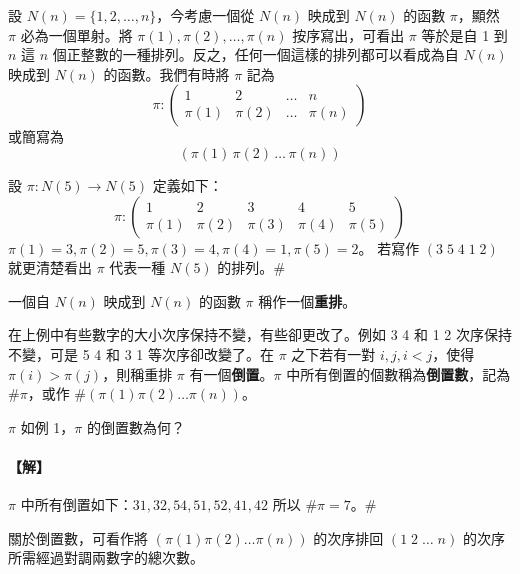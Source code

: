 設 $N(n) = \{ 1, 2, \dots, n \}$，今考慮一個從 $N(n)$ 映成到 $N(n)$ 的函數 $\pi$，顯然 $\pi$ 必為一個單射。將 $\pi(1), \pi(2), \dots, \pi(n)$ 按序寫出，可看出 $\pi$ 等於是自 1 到 $n$ 這 $n$ 個正整數的一種排列。反之，任何一個這樣的排列都可以看成為自 $N(n)$ 映成到 $N(n)$ 的函數。我們有時將 $\pi$ 記為
\begin{equation}
\pi : \begin{pmatrix} 1 & 2 & \dots & n \\ \pi(1) & \pi(2) & \dots & \pi(n) \end{pmatrix} \label{eq:b6s-1-3-2}
\end{equation}
或簡寫為
\begin{equation}
(\pi(1) \, \pi(2) \, \dots \, \pi(n)) \tag{2'} \label{eq:b6s-1-3-2p}
\end{equation}

\begin{example}\label{ex:b6s-1-12}
設 $\pi: N(5) \longrightarrow N(5)$ 定義如下：
\[ \pi : \begin{pmatrix} 1 & 2 & 3 & 4 & 5 \\ \pi(1) & \pi(2) & \pi(3) & \pi(4) & \pi(5) \end{pmatrix} \]
$\pi(1)=3, \pi(2)=5, \pi(3)=4, \pi(4)=1, \pi(5)=2$。
若寫作 $(3 \; 5 \; 4 \; 1 \; 2)$ 就更清楚看出 $\pi$ 代表一種 $N(5)$ 的排列。\hfill$\#$
\end{example}

\begin{definition}\label{def:b6s-1-6}
一個自 $N(n)$ 映成到 $N(n)$ 的函數 $\pi$ 稱作一個\textbf{重排}。
\end{definition}

在上例中有些數字的大小次序保持不變，有些卻更改了。例如 3 4 和 1 2 次序保持不變，可是 5 4 和 3 1 等次序卻改變了。在 $\pi$ 之下若有一對 $i, j, i < j$，使得 $\pi(i) > \pi(j)$，則稱重排 $\pi$ 有一個\textbf{倒置}。$\pi$ 中所有倒置的個數稱為\textbf{倒置數}，記為 $\#\pi$，或作 $\#(\pi(1)\pi(2)\dots\pi(n))$。

\begin{example}\label{ex:b6s-1-13}
$\pi$ 如例 1，$\pi$ 的倒置數為何？
\end{example}

\paragraph{【解】}
$\pi$ 中所有倒置如下：$31, 32, 54, 51, 52, 41, 42$ 所以 $\#\pi = 7$。\hfill$\#$

關於倒置數，可看作將 $(\pi(1)\pi(2)\dots\pi(n))$ 的次序排回 $(1 \; 2 \; \dots \; n)$ 的次序所需經過對調兩數字的總次數。

